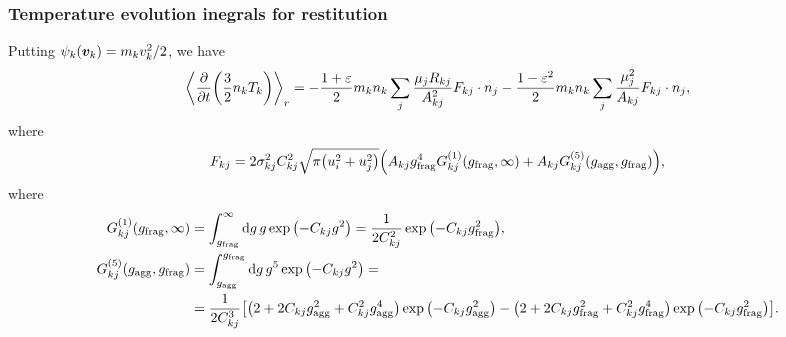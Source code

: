 \documentclass[aps,prl,preprint,groupedaddress,10pt]{revtex4-2}
\begin{document}
\subsubsection{Temperature evolution inegrals for restitution}
Putting $\psi_k(\vb*{v}_k)=m_kv_k^2/2$, we have
\begin{equation}
    \avg{\pdv{t}\pqty{\frac{3}{2}n_k T_k}}_r=-\frac{1+\eps}{2}m_kn_k
    \sum_{j}\frac{\mu_jR_{kj}}{A_{kj}^2}F_{kj}\cdot n_j-
    \frac{1-\eps^2}{2}m_kn_k\sum_{j}\frac{\mu_j^2}{A_{kj}}F_{kj}\cdot n_j,
\end{equation}
where
\begin{equation}
    F_{kj}=2\sigma_{kj}^2C_{kj}^2\sqrt{\pi\pqty{u_i^2+u_j^2}}
    \pqty{A_{kj}\ltx{g}{frag}^4G^{(1)}_{kj}(\ltx{g}{frag},\infty)+
    A_{kj}G^{(5)}_{kj}(\ltx{g}{agg},\ltx{g}{frag})},
\end{equation}
where
\begin{equation}
    \begin{split}
        G^{(1)}_{kj}(\ltx{g}{frag},\infty)&=
        \int_{\ltx{g}{frag}}^{\infty}\dd{g}g\exp\pqty{-C_{kj}g^2}=
        \frac{1}{2C_{kj}^2}\exp\pqty{-C_{kj}\ltx{g}{frag}^2},\\
        G^{(5)}_{kj}(\ltx{g}{agg},\ltx{g}{frag})&=
        \int_{\ltx{g}{agg}}^{\ltx{g}{frag}}\dd{g}g^5\exp\pqty{-C_{kj}g^2}=\\
        &=\frac{1}{2C_{kj}^3}\bqty{\pqty{2+2C_{kj}\ltx{g}{agg}^2+C_{kj}^2\ltx{g}{agg}^4}
        \exp\pqty{-C_{kj}\ltx{g}{agg}^2}-
        \pqty{2+2C_{kj}\ltx{g}{frag}^2+C_{kj}^2\ltx{g}{frag}^4}
        \exp\pqty{-C_{kj}\ltx{g}{frag}^2}}.
    \end{split}
\end{equation}
\end{document}

